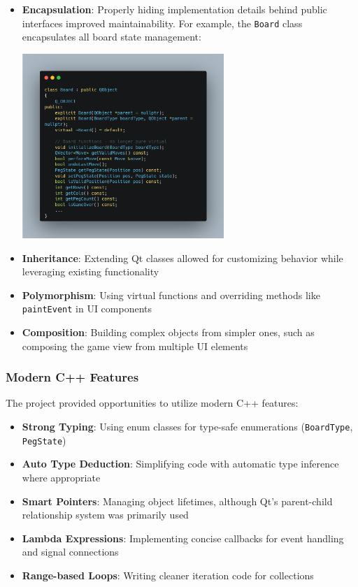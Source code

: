 \begin{itemize}
    \item \textbf{Encapsulation}: Properly hiding implementation details behind public interfaces improved maintainability. For example, the \texttt{Board} class encapsulates all board state management:
    \begin{center}
        \includegraphics[width=0.6\textwidth]{resource/code-examples/BoardDeclaration.png}
    \end{center}
    \item \textbf{Inheritance}: Extending Qt classes allowed for customizing behavior while leveraging existing functionality
    \item \textbf{Polymorphism}: Using virtual functions and overriding methods like \texttt{paintEvent} in UI components
    \item \textbf{Composition}: Building complex objects from simpler ones, such as composing the game view from multiple UI elements
\end{itemize}

\subsubsection{Modern C++ Features}
The project provided opportunities to utilize modern C++ features:

\begin{itemize}
    \item \textbf{Strong Typing}: Using enum classes for type-safe enumerations (\texttt{BoardType}, \texttt{PegState})
    \item \textbf{Auto Type Deduction}: Simplifying code with automatic type inference where appropriate
    \item \textbf{Smart Pointers}: Managing object lifetimes, although Qt's parent-child relationship system was primarily used
    \item \textbf{Lambda Expressions}: Implementing concise callbacks for event handling and signal connections
    \item \textbf{Range-based Loops}: Writing cleaner iteration code for collections
\end{itemize}

